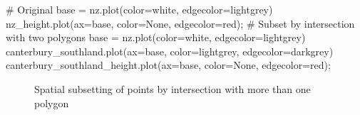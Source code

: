 \documentclass[
  letterpaper,
]{krantz}
\newenvironment{Shaded}{\begin{snugshade}}{\end{snugshade}}
\newcommand{\CommentTok}[1]{\textcolor[rgb]{0.37,0.37,0.37}{#1}}
\newcommand{\NormalTok}[1]{\textcolor[rgb]{0.00,0.23,0.31}{#1}}
\newcommand{\OperatorTok}[1]{\textcolor[rgb]{0.37,0.37,0.37}{#1}}
\newcommand{\StringTok}[1]{\textcolor[rgb]{0.13,0.47,0.30}{#1}}
\begin{document}
\begin{Shaded}
\begin{Highlighting}[]
\CommentTok{\# Original}
\NormalTok{base }\OperatorTok{=}\NormalTok{ nz.plot(color}\OperatorTok{=}\StringTok{\textquotesingle{}white\textquotesingle{}}\NormalTok{, edgecolor}\OperatorTok{=}\StringTok{\textquotesingle{}lightgrey\textquotesingle{}}\NormalTok{)}
\NormalTok{nz\_height.plot(ax}\OperatorTok{=}\NormalTok{base, color}\OperatorTok{=}\StringTok{\textquotesingle{}None\textquotesingle{}}\NormalTok{, edgecolor}\OperatorTok{=}\StringTok{\textquotesingle{}red\textquotesingle{}}\NormalTok{)}\OperatorTok{;}
\CommentTok{\# Subset by intersection with two polygons}
\NormalTok{base }\OperatorTok{=}\NormalTok{ nz.plot(color}\OperatorTok{=}\StringTok{\textquotesingle{}white\textquotesingle{}}\NormalTok{, edgecolor}\OperatorTok{=}\StringTok{\textquotesingle{}lightgrey\textquotesingle{}}\NormalTok{)}
\NormalTok{canterbury\_southland.plot(ax}\OperatorTok{=}\NormalTok{base, color}\OperatorTok{=}\StringTok{\textquotesingle{}lightgrey\textquotesingle{}}\NormalTok{, edgecolor}\OperatorTok{=}\StringTok{\textquotesingle{}darkgrey\textquotesingle{}}\NormalTok{)}
\NormalTok{canterbury\_southland\_height.plot(ax}\OperatorTok{=}\NormalTok{base, color}\OperatorTok{=}\StringTok{\textquotesingle{}None\textquotesingle{}}\NormalTok{, edgecolor}\OperatorTok{=}\StringTok{\textquotesingle{}red\textquotesingle{}}\NormalTok{)}\OperatorTok{;}
\end{Highlighting}
\end{Shaded}

\begin{figure}

\begin{minipage}{0.50\linewidth}



\end{minipage}%
%
\begin{minipage}{0.50\linewidth}



\end{minipage}%

\caption{\label{fig-spatial-subset2}Spatial subsetting of points by
intersection with more than one polygon}

\end{figure}%
\end{document}
